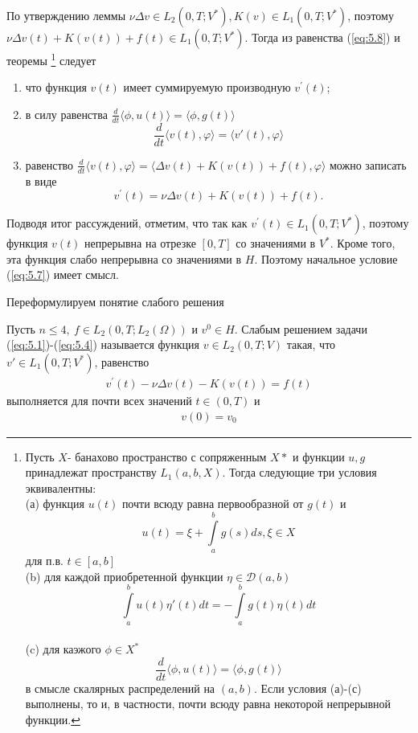 По утверждению леммы $\nu\Delta v \in L_2(0, T; V^\ast), K(v) \in L_1(0, T; V^\ast)$, поэтому $\nu\Delta v(t) + K(v(t)) + f(t) \in L_1(0, T; V^\ast)$.
Тогда из равенства (\ref{eq:5.8}) и теоремы \footnote{Пусть $X$- банахово пространство с сопряженным $X*$ и функции $u,g$  принадлежат пространству
$L_1(a,b,X).$ Тогда следующие три условия эквивалентны:\\
(а) функция $u(t)$ почти всюду равна первообразной от $g(t)$ и $$u(t)=\xi+\int\limits_a^b g(s)ds, \xi\in X$$ для п.в. $t\in[a,b]$\\
(b) для каждой приобретенной функции $\eta\in\mathcal{D}(a,b)$ $$\int\limits_a^b u(t)\eta'(t)dt= -\int\limits_a^b g(t)\eta(t)dt$$\\
(c) для каэжого $\phi\in X^*$ $$\frac{d}{dt}\langle \phi, u(t) \rangle = \langle \phi, g(t) \rangle$$ в смысле скалярных распределений на $(a,b).$
Если условия (а)-(с) выполнены, то и, в частности, почти всюду равна некоторой непрерывной функции.} следует
\begin{enumerate}
    \item что функция $v(t)$ имеет суммируемую производную $v^\prime(t)$;
    \item в силу равенства $\frac{d}{dt}\langle \phi, u(t) \rangle = \langle \phi, g(t) \rangle$
    $$\frac{d}{dt} \langle v(t), \varphi \rangle = \langle v'(t), \varphi \rangle $$
    \item равенство $\frac{d}{dt}\langle v(t), \varphi \rangle=\langle \Delta v(t)+K(v(t))+f(t),\varphi\rangle$ можно записать в виде
    $$v^\prime(t)=\nu\Delta v(t)+K(v(t))+f(t).$$
\end{enumerate}

Подводя итог рассуждений, отметим, что так как $v^\prime(t) \in L_1(0, T; V^\ast)$, поэтому функция $v(t)$ непрерывна на отрезке 
$[0, T]$ со значениями в $V^\ast$. Кроме того, эта функция слабо непрерывна со значениями в $H$. Поэтому начальное условие 
(\ref{eq:5.7}) имеет смысл.

Переформулируем понятие слабого решения
\begin{definition}
    Пусть $n \le 4, \ f \in L_2(0, T; L_2(\Omega))$ и $v^0 \in H$. Слабым решением задачи (\ref{eq:5.1})-(\ref{eq:5.4}) называется функция
    $v \in L_2(0, T; V)$ такая, что $v\prime\in L_1(0, T; V^\ast)$, равенство
    \begin{equation}\label{eq:5.11}
        \begin{gathered}
            v^\prime(t) - \nu\Delta v(t) - K(v(t)) = f(t)
        \end{gathered}
    \end{equation}
    выполняется для почти всех значений $t \in (0, T)$ и
    \begin{equation}\label{eq:5.12}
        \begin{gathered}
            v(0) = v_0
        \end{gathered}
    \end{equation}
\end{definition}


